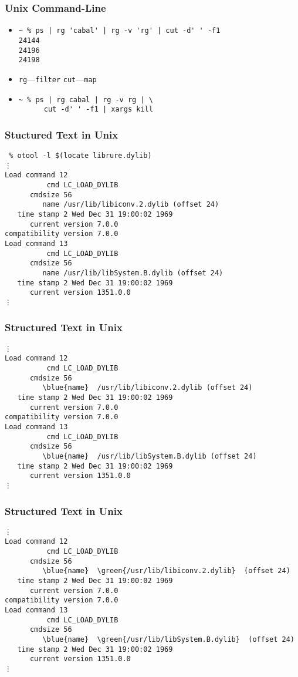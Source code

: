 \documentclass{beamer}
\begin{document}
\begin{frame}[fragile]
  \frametitle{Unix Command-Line}
  \begin{itemize}
      \item
        \begin{verbatim}
~ % ps | rg 'cabal' | rg -v 'rg' | cut -d' ' -f1
24144
24196
24198
        \end{verbatim}
      \item \verb|rg|---\verb|filter| \verb|cut|---\verb|map|
      \item
        \begin{verbatim}
~ % ps | rg cabal | rg -v rg | \
      cut -d' ' -f1 | xargs kill
        \end{verbatim}
    \end{itemize}
\end{frame}

\begin{frame}[fragile]
  \frametitle{Stuctured Text in Unix}
    \begin{verbatim}
 % otool -l $(locate librure.dylib)
⋮
Load command 12
          cmd LC_LOAD_DYLIB
      cmdsize 56
         name /usr/lib/libiconv.2.dylib (offset 24)
   time stamp 2 Wed Dec 31 19:00:02 1969
      current version 7.0.0
compatibility version 7.0.0
Load command 13
          cmd LC_LOAD_DYLIB
      cmdsize 56
         name /usr/lib/libSystem.B.dylib (offset 24)
   time stamp 2 Wed Dec 31 19:00:02 1969
      current version 1351.0.0
⋮
    \end{verbatim}

\end{frame}

\begin{frame}[fragile]
  \frametitle{Structured Text in Unix}
    \begin{Verbatim}[commandchars=\\\{\}]
 % otool -l $(locate librure.dylib)
⋮
Load command 12
          cmd LC_LOAD_DYLIB
      cmdsize 56
         \blue{name}  /usr/lib/libiconv.2.dylib (offset 24)
   time stamp 2 Wed Dec 31 19:00:02 1969
      current version 7.0.0
compatibility version 7.0.0
Load command 13
          cmd LC_LOAD_DYLIB
      cmdsize 56
         \blue{name}  /usr/lib/libSystem.B.dylib (offset 24)
   time stamp 2 Wed Dec 31 19:00:02 1969
      current version 1351.0.0
⋮
    \end{Verbatim}
\end{frame}

\begin{frame}[fragile]
  \frametitle{Structured Text in Unix}
    \begin{Verbatim}[commandchars=\\\{\}]
 % otool -l $(locate librure.dylib)
⋮
Load command 12
          cmd LC_LOAD_DYLIB
      cmdsize 56
         \blue{name}  \green{/usr/lib/libiconv.2.dylib}  (offset 24)
   time stamp 2 Wed Dec 31 19:00:02 1969
      current version 7.0.0
compatibility version 7.0.0
Load command 13
          cmd LC_LOAD_DYLIB
      cmdsize 56
         \blue{name}  \green{/usr/lib/libSystem.B.dylib}  (offset 24)
   time stamp 2 Wed Dec 31 19:00:02 1969
      current version 1351.0.0
⋮
    \end{Verbatim}
\end{frame}
\end{document}
